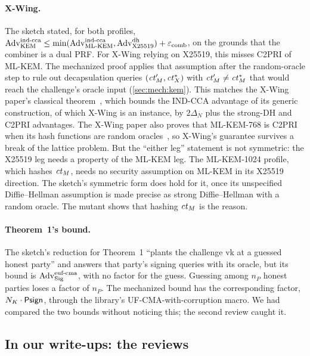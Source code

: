 \paragraph{X-Wing.} The sketch stated, for both profiles,
$\mathrm{Adv}^{\text{ind-cca}}_{\text{KEM}} \le \min(\mathrm{Adv}^{\text{ind-cca}}_{\text{ML-KEM}}, \mathrm{Adv}^{\text{dh}}_{\text{X25519}}) + \varepsilon_{\text{comb}}$,
on the grounds that the combiner is a dual PRF. For X-Wing relying on
X25519, this misses C2PRI of ML-KEM. The mechanized proof applies that
assumption after the random-oracle step to rule out decapsulation queries
$(\mathit{ct}_M', \mathit{ct}_X^*)$ with $\mathit{ct}_M' \ne \mathit{ct}_M^*$ that would reach the
challenge's oracle input (\cref{sec:mech:kem}). This matches the X-Wing
paper's classical theorem~\cite[Thm.~1]{XWing}, which bounds the IND-CCA
advantage of its generic construction, of which X-Wing is an instance, by
$2\Delta_N$ plus the strong-DH and C2PRI advantages. The X-Wing paper also
proves that ML-KEM-768 is C2PRI when its hash functions are random
oracles~\cite[Thm.~3]{XWing}, so X-Wing's guarantee survives a break of the
lattice problem. But the ``either leg'' statement is not symmetric: the
X25519 leg needs a property of the ML-KEM leg. The ML-KEM-1024 profile,
which hashes $\mathit{ct}_M$, needs no security assumption on ML-KEM in its X25519
direction. The sketch's symmetric form does hold for it, once its
unspecified Diffie--Hellman assumption is made precise as strong
Diffie--Hellman with a random oracle. The mutant
 shows that hashing $\mathit{ct}_M$ is the
reason.

\paragraph{Theorem~1's bound.} The sketch's reduction for Theorem~1 ``plants
the challenge vk at a guessed honest party'' and answers that party's
signing queries with its oracle, but its bound is
$\mathrm{Adv}^{\text{euf-cma}}_{\text{Sig}}$, with no factor for the guess. Guessing
among $n_P$ honest parties loses a factor of $n_P$. The mechanized bound has
the corresponding factor, $N_K \cdot \mathsf{Psign}$, through the library's
UF-CMA-with-corruption macro. We had compared the two bounds without
noticing this; the second review caught it.

\subsection{In our write-ups: the reviews}\label{sec:reviewcaught}

